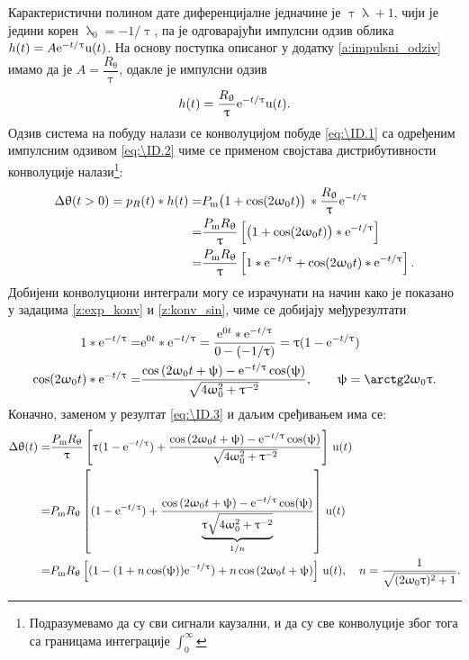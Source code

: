 Карактеристични полином дате диференцијалне једначине је $\uptau \uplambda + 1$, чији је једини корен 
$\uplambda_0 = -1/\uptau$, па је одговарајући импулсни одзив облика $h(t) = A {\rm e}^{-t/\uptau} {\rm u}(t)$. На основу 
поступка описаног у додатку \ref{a:impulsni_odziv} имамо да је 
$A = \dfrac{R_{\uptheta}}{\uptau}$, одакле је импулсни одзив 
\begin{equation}
h(t) = \dfrac{R_{\uptheta}}{\uptau} \ee^{-t/\uptau} \uu(t). \label{eq:\ID.2}
\end{equation}
Одзив система на побуду налази се конволуцијом побуде \eqref{eq:\ID.1} са одређеним импулсним одзивом \eqref{eq:\ID.2}
чиме се применом својстава дистрибутивности конволуције налази\footnote{Подразумевамо да су сви сигнали каузални, и 
да су све конволуције због тога са границама интеграције $\int_{0}^{\infty}$}:
\begin{align}
    \Delta\uptheta(t > 0) = p_{R}(t) \ast h(t) =& 
    P_{\rm m} \bigl(1 + \cos(2\upomega_0 t) \bigr) \, \ast \dfrac{R_{\uptheta}}{\uptau} \ee^{-t/\uptau}  \\
    =& \dfrac{P_{\rm m} R_{\uptheta}}{\uptau} 
    \left[ \bigl(1 + \cos(2\upomega_0 t) \bigr)\ast \ee^{-t/\uptau} \right] \\
    =& \dfrac{P_{\rm m} R_{\uptheta}}{\uptau}
    \left[ 1 \ast \ee^{-t/\uptau} + \cos(2\upomega_0 t) \ast \ee^{-t/\uptau} \right]. \label{eq:\ID.3}
\end{align}
Добијени конволуциони интеграли могу се израчунати на начин како је показано у задацима 
\ref{z:exp_konv} и \ref{z:konv_sin}, чиме се добијају међурезултати
\begin{align}
    1 \ast \ee^{-t/\uptau}  =& \ee^{0t} \ast \ee^{-t/\uptau} =   
    \dfrac{\ee^{0t} \ast \ee^{-t/\uptau}}{ 0 - (-1/\uptau) } = \uptau (1 - \ee^{-t/\uptau}) \\
    \cos(2\upomega_0 t) \ast \ee^{-t/\uptau} =&
    \dfrac{
        \cos\left( 2\upomega_0 t +  \uppsi \right)
        - \ee^{-t/\uptau} \cos(\uppsi)
        }{ \sqrt{ 4\upomega_0^2 + \uptau^{-2} } }, \qquad \uppsi = \arctg 2\upomega_0\uptau.
\end{align}
Коначно, заменом у резултат \eqref{eq:\ID.3} и даљим сређивањем има се:
\begin{align}
    \Delta\uptheta(t) =& \dfrac{P_{\rm m} R_{\uptheta}}{\uptau}
    \left[ \uptau (1 - {\rm e}^{-t/\uptau}) +  
    \dfrac{
        \cos\left( 2\upomega_0 t +  \uppsi \right)
        - {\rm e}^{-t/\uptau} \cos(\uppsi)
        }{ \sqrt{ 4\upomega_0^2 + \uptau^{-2} } } 
    \right] \, {\rm u}(t) \\
    =&
    {P_{\rm m} R_{\uptheta}}
    \left[ (1 - {\rm e}^{-t/\uptau}) +
    \dfrac{
        \cos\left( 2\upomega_0 t +  \uppsi \right)
        - {\rm e}^{-t/\uptau} \cos(\uppsi)
        }{ \underbrace{\uptau  \sqrt{ 4\upomega_0^2 + \uptau^{-2}} }_{1/n} } 
    \right] \, {\rm u}(t) \\
    =& 
    {P_{\rm m} R_{\uptheta}}
    \left[ (1 - (1 + n\cos(\uppsi)) {\rm e}^{-t/\uptau} )
        + n \cos\left( 2\upomega_0 t +  \uppsi \right)
    \right] \, {\rm u}(t), \quad n = \dfrac{1}{ \sqrt{ (2\upomega_0 \uptau )^2 + 1 }}.
\end{align}
